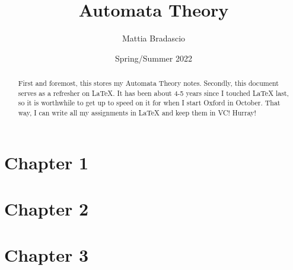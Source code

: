 \documentclass[12pt, letterpaper]{article}
\title{Automata Theory}
\author{Mattia Bradascio}
\date{Spring/Summer 2022}
\begin{document}
\begin{titlepage}
\maketitle
\end{titlepage}

\begin{abstract}

    First and foremost, this stores my Automata Theory notes.
    \indent Secondly, this document serves as a refresher on LaTeX. 
    It has been about 4-5 years since I touched LaTeX last, so it is 
    worthwhile to get up to speed on it for when I start Oxford in October.
    That way, I can write all my assignments in LaTeX and keep them in VC! Hurray! \\

\end{abstract}

\section{Chapter 1}


\section{Chapter 2}


\section{Chapter 3}

\end{document}

